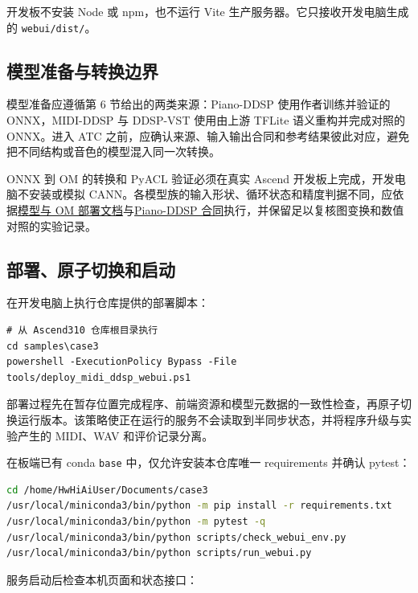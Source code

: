 开发板不安装 Node 或 npm，也不运行 Vite
生产服务器。它只接收开发电脑生成的
\passthrough{\lstinline!webui/dist/!}。

\subsection{模型准备与转换边界}\label{src-experiment-case3-prepare-models}

模型准备应遵循第 6 节给出的两类来源：Piano-DDSP 使用作者训练并验证的
ONNX，MIDI-DDSP 与 DDSP-VST 使用由上游 TFLite 语义重构并完成对照的
ONNX。进入 ATC
之前，应确认来源、输入输出合同和参考结果彼此对应，避免把不同结构或音色的模型混入同一次转换。

ONNX 到 OM 的转换和 PyACL 验证必须在真实 Ascend
开发板上完成，开发电脑不安装或模拟
CANN。各模型族的输入形状、循环状态和精度判据不同，应依据\href{https://github.com/zhouxzh/Ascend310/blob/main/samples/case3/docs/03-om-deployment.md}{模型与
OM
部署文档}与\href{https://github.com/zhouxzh/Ascend310/blob/main/samples/case3/docs/04-piano-ddsp.md}{Piano-DDSP
合同}执行，并保留足以复核图变换和数值对照的实验记录。

\subsection{部署、原子切换和启动}\label{src-experiment-case3-deploy}

在开发电脑上执行仓库提供的部署脚本：

\begin{lstlisting}
# 从 Ascend310 仓库根目录执行
cd samples\case3
powershell -ExecutionPolicy Bypass -File tools/deploy_midi_ddsp_webui.ps1
\end{lstlisting}

部署过程先在暂存位置完成程序、前端资源和模型元数据的一致性检查，再原子切换运行版本。该策略使正在运行的服务不会读取到半同步状态，并将程序升级与实验产生的
MIDI、WAV 和评价记录分离。

在板端已有 conda \passthrough{\lstinline!base!} 中，仅允许安装本仓库唯一
requirements 并确认 pytest：

\begin{lstlisting}[language=bash]
cd /home/HwHiAiUser/Documents/case3
/usr/local/miniconda3/bin/python -m pip install -r requirements.txt
/usr/local/miniconda3/bin/python -m pytest -q
/usr/local/miniconda3/bin/python scripts/check_webui_env.py
/usr/local/miniconda3/bin/python scripts/run_webui.py
\end{lstlisting}

服务启动后检查本机页面和状态接口：

